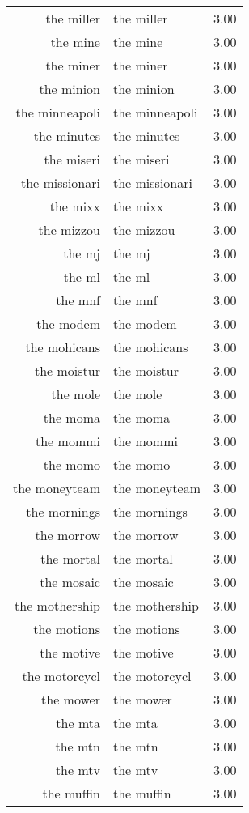 \begin{table}[ht]
\begin{tabular}{rlr}
  the miller & the miller & 3.00 \\ 
  the mine & the mine & 3.00 \\ 
  the miner & the miner & 3.00 \\ 
  the minion & the minion & 3.00 \\ 
  the minneapoli & the minneapoli & 3.00 \\ 
  the minutes & the minutes & 3.00 \\ 
  the miseri & the miseri & 3.00 \\ 
  the missionari & the missionari & 3.00 \\ 
  the mixx & the mixx & 3.00 \\ 
  the mizzou & the mizzou & 3.00 \\ 
  the mj & the mj & 3.00 \\ 
  the ml & the ml & 3.00 \\ 
  the mnf & the mnf & 3.00 \\ 
  the modem & the modem & 3.00 \\ 
  the mohicans & the mohicans & 3.00 \\ 
  the moistur & the moistur & 3.00 \\ 
  the mole & the mole & 3.00 \\ 
  the moma & the moma & 3.00 \\ 
  the mommi & the mommi & 3.00 \\ 
  the momo & the momo & 3.00 \\ 
  the moneyteam & the moneyteam & 3.00 \\ 
  the mornings & the mornings & 3.00 \\ 
  the morrow & the morrow & 3.00 \\ 
  the mortal & the mortal & 3.00 \\ 
  the mosaic & the mosaic & 3.00 \\ 
  the mothership & the mothership & 3.00 \\ 
  the motions & the motions & 3.00 \\ 
  the motive & the motive & 3.00 \\ 
  the motorcycl & the motorcycl & 3.00 \\ 
  the mower & the mower & 3.00 \\ 
  the mta & the mta & 3.00 \\ 
  the mtn & the mtn & 3.00 \\ 
  the mtv & the mtv & 3.00 \\ 
  the muffin & the muffin & 3.00 \\ 

\end{tabular}
\end{table}
